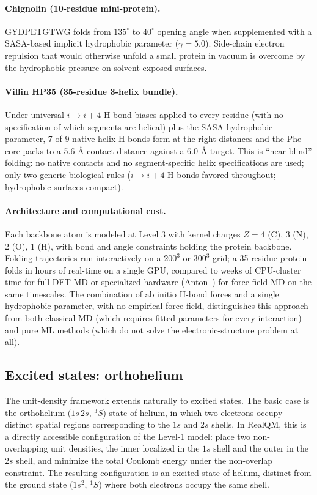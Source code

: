 \documentclass[11pt]{article}
\begin{document}
\paragraph{Chignolin (10-residue mini-protein).}
GYDPETGTWG folds from $135^\circ$ to $40^\circ$ opening angle when supplemented with a SASA-based implicit hydrophobic parameter ($\gamma = 5.0$). Side-chain electron repulsion that would otherwise unfold a small protein in vacuum is overcome by the hydrophobic pressure on solvent-exposed surfaces.

\paragraph{Villin HP35 (35-residue 3-helix bundle).}
Under universal $i \to i{+}4$ H-bond biases applied to every residue (with no specification of which segments are helical) plus the SASA hydrophobic parameter, 7 of 9 native helix H-bonds form at the right distances and the Phe core packs to a 5.6 \AA{} contact distance against a 6.0 \AA{} target. This is ``near-blind'' folding: no native contacts and no segment-specific helix specifications are used; only two generic biological rules ($i \to i{+}4$ H-bonds favored throughout; hydrophobic surfaces compact).

\paragraph{Architecture and computational cost.}
Each backbone atom is modeled at Level 3 with kernel charges $Z = 4$ (C), 3 (N), 2 (O), 1 (H), with bond and angle constraints holding the protein backbone. Folding trajectories run interactively on a $200^3$ or $300^3$ grid; a 35-residue protein folds in hours of real-time on a single GPU, compared to weeks of CPU-cluster time for full DFT-MD or specialized hardware (Anton~\cite{Shaw10}) for force-field MD on the same timescales. The combination of ab initio H-bond forces and a single hydrophobic parameter, with no empirical force field, distinguishes this approach from both classical MD (which requires fitted parameters for every interaction) and pure ML methods (which do not solve the electronic-structure problem at all).

\subsection{Excited states: orthohelium}\label{sec:orthohelium}

The unit-density framework extends naturally to excited states. The basic case is the orthohelium ($1s\,2s$, $^3S$) state of helium, in which two electrons occupy distinct spatial regions corresponding to the $1s$ and $2s$ shells. In RealQM, this is a directly accessible configuration of the Level-1 model: place two non-overlapping unit densities, the inner localized in the $1s$ shell and the outer in the $2s$ shell, and minimize the total Coulomb energy under the non-overlap constraint. The resulting configuration is an excited state of helium, distinct from the ground state ($1s^2$, $^1S$) where both electrons occupy the same shell.
\end{document}
